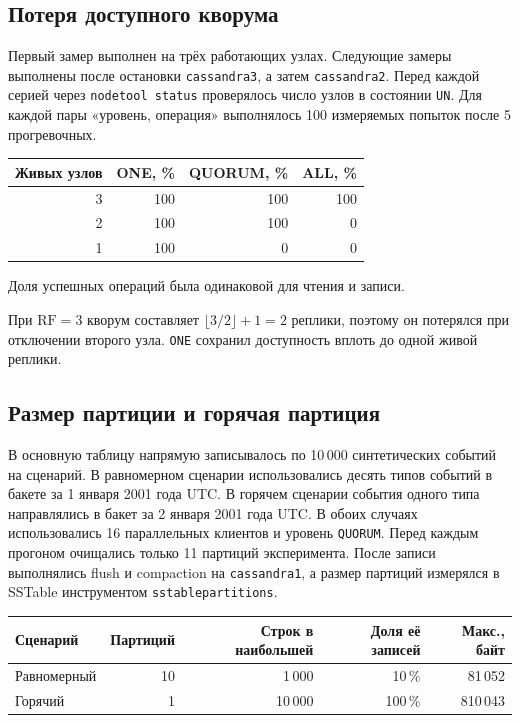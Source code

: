 \documentclass[12pt,a4paper]{article}
\begin{document}
\subsection{Потеря доступного кворума}

Первый замер выполнен на трёх работающих узлах. Следующие замеры выполнены после остановки \texttt{cassandra3}, а затем \texttt{cassandra2}. Перед каждой серией через \texttt{nodetool status} проверялось число узлов в состоянии \texttt{UN}. Для каждой пары «уровень, операция» выполнялось 100 измеряемых попыток после 5 прогревочных.

\begin{center}
\begin{tabular}{@{}rrrr@{}}
\toprule
Живых узлов & ONE, \% & QUORUM, \% & ALL, \% \\
\midrule
3 & 100 & 100 & 100 \\
2 & 100 & 100 & 0 \\
1 & 100 & 0 & 0 \\
\bottomrule
\end{tabular}
\end{center}

Доля успешных операций была одинаковой для чтения и записи.

При \(\mathrm{RF}=3\) кворум составляет \(\lfloor 3/2\rfloor + 1 = 2\) реплики, поэтому он потерялся при отключении второго узла. \texttt{ONE} сохранил доступность вплоть до одной живой реплики. 

\subsection{Размер партиции и горячая партиция}

В основную таблицу  напрямую записывалось по 10\,000 синтетических событий на сценарий. В равномерном сценарии использовались десять типов событий в бакете за 1 января 2001 года UTC. В горячем сценарии события одного типа направлялись в бакет за 2 января 2001 года UTC. В обоих случаях использовались 16 параллельных клиентов и уровень \texttt{QUORUM}. Перед каждым прогоном очищались только 11 партиций эксперимента. После записи выполнялись flush и compaction на \texttt{cassandra1}, а размер партиций измерялся в SSTable инструментом \texttt{sstablepartitions}.

\begin{center}
\small
\begin{tabular}{@{}lrrrr@{}}
\toprule
Сценарий & Партиций & Строк в наибольшей & Доля её записей & Макс., байт \\
\midrule
Равномерный & 10 & 1\,000 & 10\,\% & 81\,052 \\
Горячий & 1 & 10\,000 & 100\,\% & 810\,043 \\
\bottomrule
\end{tabular}
\end{center}
\end{document}
